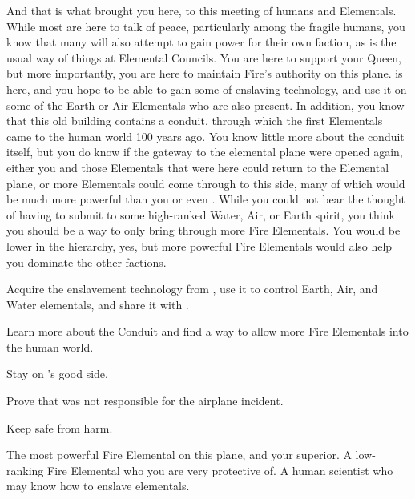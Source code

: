 \documentclass[char]{elementals}
\begin{document}
And that is what brought you here, to this meeting of humans and Elementals.  While most are here to talk of peace, particularly among the fragile humans, you know that many will also attempt to gain power for their own faction, as is the usual way of things at Elemental Councils.  You are here to support your Queen, but more importantly, you are here to maintain Fire's authority on this plane.  \cMS{} is here, and you hope to be able to gain some of  enslaving technology, and use it on some of the Earth or Air Elementals who are also present.  In addition, you know that this old building contains a conduit, through which the first Elementals came to the human world 100 years ago.  You know little more about the conduit itself, but you do know if the gateway to the elemental plane were opened again, either you and those Elementals that were here could return to the Elemental plane, or more Elementals could come through to this side, many of which would be much more powerful than you or even \cQueen{}.  While you could not bear the thought of having to submit to some high-ranked Water, Air, or Earth spirit, you think you should be a way to only bring through more Fire Elementals.  You would be lower in the hierarchy, yes, but more powerful Fire Elementals would also help you dominate the other factions.  

\begin{itemz}[Goals]
  \item Acquire the enslavement technology from \cMS{}, use it to control Earth, Air, and Water elementals, and share it with \cQueen{}.
  \item Learn more about the Conduit and find a way to allow more Fire Elementals into the human world.
  \item Stay on \cQueen{}'s good side.
  \item Prove that \cJuliet{} was not responsible for the airplane incident.
  \item Keep \cJuliet{} safe from harm.
\end{itemz}

\begin{contacts}
  \contact{\cQueen{}}  The most powerful Fire Elemental on this plane, and your superior.
  \contact{\cJuliet{}}  A low-ranking Fire Elemental who you are very protective of.
  \contact{\cMS{}}  A human scientist who may know how to enslave elementals.
\end{contacts}
\end{document}
